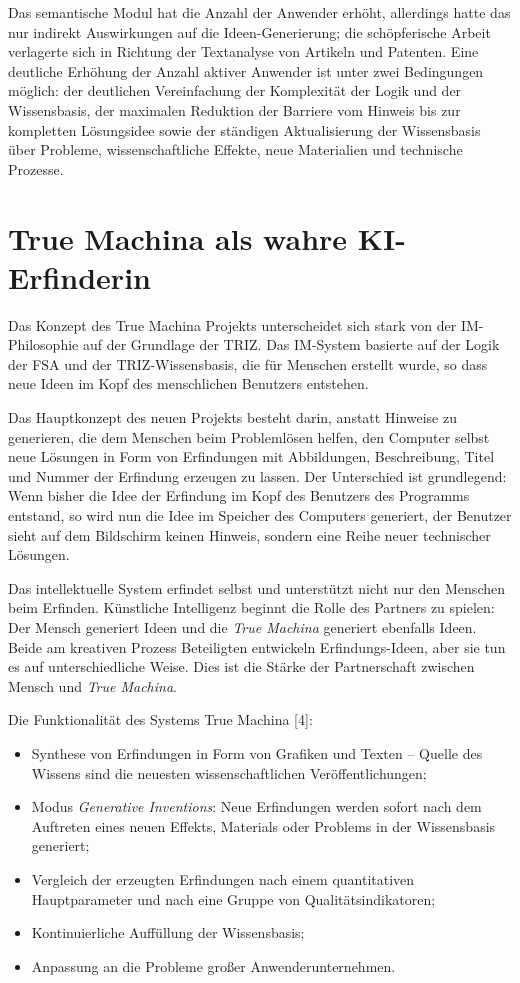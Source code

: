 \documentclass[11pt,a4paper]{article}
\begin{document}
Das semantische Modul hat die Anzahl der Anwender erhöht, allerdings hatte das
nur indirekt Auswirkungen auf die Ideen-Generierung; die schöpferische Arbeit
verlagerte sich in Richtung der Textanalyse von Artikeln und Patenten. Eine
deutliche Erhöhung der Anzahl aktiver Anwender ist unter zwei Bedingungen
möglich: der deutlichen Vereinfachung der Komplexität der Logik und der
Wissensbasis, der maximalen Reduktion der Barriere vom Hinweis bis zur
kompletten Lösungsidee sowie der ständigen Aktualisierung der Wissensbasis
über Probleme, wissenschaftliche Effekte, neue Materialien und technische
Prozesse.

\section{True Machina als wahre KI-Erfinderin}

Das Konzept des True Machina Projekts unterscheidet sich stark von der
IM-Philosophie auf der Grundlage der TRIZ.  Das IM-System basierte auf der
Logik der FSA und der TRIZ-Wissensbasis, die für Menschen erstellt wurde, so
dass neue Ideen im Kopf des menschlichen Benutzers entstehen.

Das Hauptkonzept des neuen Projekts besteht darin, anstatt Hinweise zu
generieren, die dem Menschen beim Problemlösen helfen, den Computer selbst
neue Lösungen in Form von Erfindungen mit Abbildungen, Beschreibung, Titel und
Nummer der Erfindung erzeugen zu lassen. Der Unterschied ist grundlegend: Wenn
bisher die Idee der Erfindung im Kopf des Benutzers des Programms entstand, so
wird nun die Idee im Speicher des Computers generiert, der Benutzer sieht auf
dem Bildschirm keinen Hinweis, sondern eine Reihe neuer technischer Lösungen.

Das intellektuelle System erfindet selbst und unterstützt nicht nur den
Menschen beim Erfinden.  Künstliche Intelligenz beginnt die Rolle des Partners
zu spielen: Der Mensch generiert Ideen und die \emph{True Machina} generiert
ebenfalls Ideen. Beide am kreativen Prozess Beteiligten entwickeln
Erfindungs-Ideen, aber sie tun es auf unterschiedliche Weise. Dies ist die
Stärke der Partnerschaft zwischen Mensch und \emph{True Machina}.

Die Funktionalität des Systems True Machina [4]:
\begin{itemize}
\item Synthese von Erfindungen in Form von Grafiken und Texten -- Quelle des
  Wissens sind die neuesten wissenschaftlichen Veröffentlichungen;
\item Modus \emph{Generative Inventions}: Neue Erfindungen werden sofort nach
  dem Auftreten eines neuen Effekts, Materials oder Problems in der
  Wissensbasis generiert;
\item Vergleich der erzeugten Erfindungen nach einem quantitativen
  Hauptparameter und nach eine Gruppe von Qualitätsindikatoren;
\item Kontinuierliche Auffüllung der Wissensbasis;
\item Anpassung an die Probleme großer Anwenderunternehmen.
\end{itemize}
\end{document}
